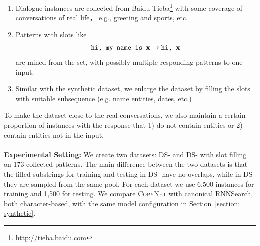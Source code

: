 \begin{enumerate}
	\vspace{-5pt}
	\item Dialogue instances are collected from Baidu Tieba\footnote{http://tieba.baidu.com} with some coverage of conversations of real life， e.g., greeting and sports, etc.\vspace{-7pt}
	\item Patterns with slots like 	\vspace{-10pt}
	\[\texttt{hi, my name is } \mathbf{x}\rightarrow \texttt{hi, } \mathbf{x} 	\vspace{-10pt} \]   
	are mined from the set, with possibly multiple responding patterns to one input.
	\vspace{-2pt}
	\item Similar with the synthetic dataset, we enlarge the dataset by filling the slots with suitable subsequence (e.g. name entities, dates, etc.)
	\vspace{-5pt}
\end{enumerate} 
To make the dataset close to the real conversations, we also maintain a certain proportion of instances with the response that 1) do not contain entities or 2) contain entities not in the input.  \\ \vspace{-7pt}\\
\textbf{Experimental Setting:} We create two datasets: DS-\uppercase\expandafter{} and DS-\uppercase\expandafter{} with slot filling on 173 collected patterns. The main difference between the two datasets is that the filled substrings for training and testing in DS-\uppercase\expandafter{} have no overlaps, while in DS-\uppercase\expandafter{} they are sampled from the same pool. For each dataset we use 6,500 instances for training and 1,500 for testing. We compare \textsc{CopyNet} with canonical RNNSearch, both character-based, with the same model configuration in Section~\ref{section: synthetic}. \vspace{-5pt} 

